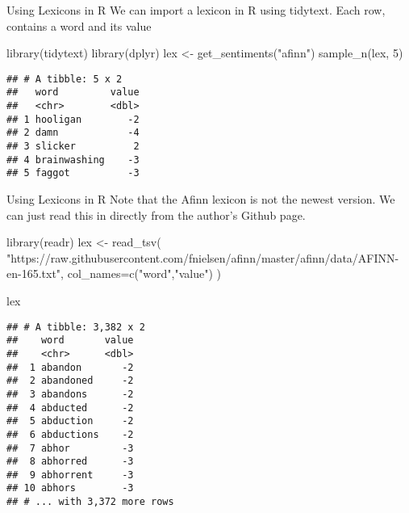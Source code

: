 \documentclass[
  10pt,
  ignorenonframetext,
  aspectratio=169]{beamer}
\newenvironment{Shaded}{\begin{snugshade}}{\end{snugshade}}
\newcommand{\AttributeTok}[1]{\textcolor[rgb]{0.80,0.80,0.80}{#1}}
\newcommand{\DecValTok}[1]{\textcolor[rgb]{0.86,0.86,0.80}{#1}}
\newcommand{\FunctionTok}[1]{\textcolor[rgb]{0.94,0.94,0.56}{#1}}
\newcommand{\NormalTok}[1]{\textcolor[rgb]{0.80,0.80,0.80}{#1}}
\newcommand{\OtherTok}[1]{\textcolor[rgb]{0.94,0.94,0.56}{#1}}
\newcommand{\StringTok}[1]{\textcolor[rgb]{0.80,0.58,0.58}{#1}}
\begin{document}
\begin{frame}[fragile]{Using Lexicons in R}
\protect\hypertarget{using-lexicons-in-r}{}
We can import a lexicon in R using tidytext. Each row, contains a word
and its value

\medskip

\begin{Shaded}
\begin{Highlighting}[]
\FunctionTok{library}\NormalTok{(tidytext)}
\FunctionTok{library}\NormalTok{(dplyr)}
\NormalTok{lex }\OtherTok{\textless{}{-}} \FunctionTok{get\_sentiments}\NormalTok{(}\StringTok{"afinn"}\NormalTok{)}
\FunctionTok{sample\_n}\NormalTok{(lex, }\DecValTok{5}\NormalTok{)}
\end{Highlighting}
\end{Shaded}

\begin{verbatim}
## # A tibble: 5 x 2
##   word         value
##   <chr>        <dbl>
## 1 hooligan        -2
## 2 damn            -4
## 3 slicker          2
## 4 brainwashing    -3
## 5 faggot          -3
\end{verbatim}
\end{frame}

\begin{frame}[fragile]{Using Lexicons in R}
\protect\hypertarget{using-lexicons-in-r-1}{}
Note that the Afinn lexicon is not the newest version. We can just read
this in directly from the author's Github page.

\medskip

\begin{Shaded}
\begin{Highlighting}[]
\FunctionTok{library}\NormalTok{(readr)}
\NormalTok{lex }\OtherTok{\textless{}{-}} \FunctionTok{read\_tsv}\NormalTok{(}
  \StringTok{"https://raw.githubusercontent.com/fnielsen/afinn/master/afinn/data/AFINN{-}en{-}165.txt"}\NormalTok{,}
  \AttributeTok{col\_names=}\FunctionTok{c}\NormalTok{(}\StringTok{"word"}\NormalTok{,}\StringTok{"value"}\NormalTok{)}
\NormalTok{)}

\NormalTok{lex}
\end{Highlighting}
\end{Shaded}

\begin{verbatim}
## # A tibble: 3,382 x 2
##    word       value
##    <chr>      <dbl>
##  1 abandon       -2
##  2 abandoned     -2
##  3 abandons      -2
##  4 abducted      -2
##  5 abduction     -2
##  6 abductions    -2
##  7 abhor         -3
##  8 abhorred      -3
##  9 abhorrent     -3
## 10 abhors        -3
## # ... with 3,372 more rows
\end{verbatim}
\end{frame}
\end{document}
